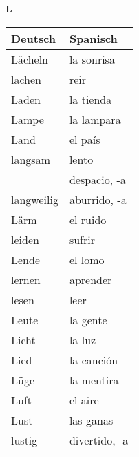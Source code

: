 \begin{flushright}\begin{Huge}\textbf{L}\end{Huge}\end{flushright}

\begin{longtable}{p{} p{}} 
\textbf{Deutsch}     & \textbf{Spanisch}                                       \\ \hline
\hline
\endhead %
Lächeln & la sonrisa\\
lachen & reir\\
Laden & la tienda\\
Lampe & la lampara\\
Land & el país\\
langsam & lento \\
~ & despacio, -a\\ 
langweilig & aburrido, -a\\
Lärm & el ruido \\
leiden & sufrir\\
Lende & el lomo\\
lernen & aprender\\
lesen & leer \\
Leute & la gente\\
Licht & la luz\\
Lied & la canción\\
Lüge & la mentira\\
Luft & el aire\\
Lust & las ganas\\
lustig & divertido, -a\\
\end{longtable}
